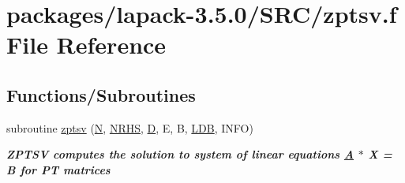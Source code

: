 \hypertarget{zptsv_8f}{}\section{packages/lapack-\/3.5.0/\+S\+R\+C/zptsv.f File Reference}
\label{zptsv_8f}
\subsection*{Functions/\+Subroutines}
\begin{DoxyCompactItemize}
\item 
subroutine \hyperlink{group__complex16PTsolve_ga032a35206cb94896480a1fbfdba46809}{zptsv} (\hyperlink{polmisc_8c_a0240ac851181b84ac374872dc5434ee4}{N}, \hyperlink{example__user_8c_aa0138da002ce2a90360df2f521eb3198}{N\+R\+H\+S}, \hyperlink{odrpack_8h_a7dae6ea403d00f3687f24a874e67d139}{D}, E, B, \hyperlink{example__user_8c_a50e90a7104df172b5a89a06c47fcca04}{L\+D\+B}, I\+N\+F\+O)
\begin{DoxyCompactList}\small\item\em {\bfseries  Z\+P\+T\+S\+V computes the solution to system of linear equations \hyperlink{classA}{A} $\ast$ X = B for P\+T matrices} \end{DoxyCompactList}\end{DoxyCompactItemize}
